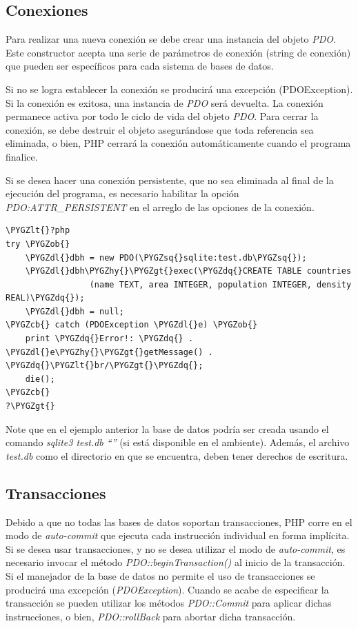 \documentclass[a5paper,10pt,spanish]{sphinxmanual}
\def\PYGZob{\char`\{}
\def\PYGZcb{\char`\}}
\def\PYGZlt{\char`\<}
\def\PYGZgt{\char`\>}
\def\PYGZdl{\char`\$}
\def\PYGZhy{\char`\-}
\def\PYGZsq{\char`\'}
\def\PYGZdq{\char`\"}
\begin{document}
\subsection{Conexiones}
\label{Tutorial5_BasesDatos.md:conexiones}
Para realizar una nueva conexión se debe crear una instancia del objeto
\emph{PDO}. Este constructor acepta una serie de parámetros de conexión
(string de conexión) que pueden ser específicos para cada sistema de
bases de datos.

Si no se logra establecer la conexión se producirá una excepción
(PDOException). Si la conexión es exitosa, una instancia de \emph{PDO} será
devuelta. La conexión permanece activa por todo le ciclo de vida del
objeto \emph{PDO}. Para cerrar la conexión, se debe destruir el objeto
asegurándose que toda referencia sea eliminada, o bien, PHP cerrará la
conexión automáticamente cuando el programa finalice.

Si se desea hacer una conexión persistente, que no sea eliminada al
final de la ejecución del programa, es necesario habilitar la opción
\emph{PDO:ATTR\_PERSISTENT} en el arreglo de las opciones de la conexión.

\begin{Verbatim}[commandchars=\\\{\}]
\PYGZlt{}?php
try \PYGZob{}
    \PYGZdl{}dbh = new PDO(\PYGZsq{}sqlite:test.db\PYGZsq{});
    \PYGZdl{}dbh\PYGZhy{}\PYGZgt{}exec(\PYGZdq{}CREATE TABLE countries
                 (name TEXT, area INTEGER, population INTEGER, density REAL)\PYGZdq{});
    \PYGZdl{}dbh = null;
\PYGZcb{} catch (PDOException \PYGZdl{}e) \PYGZob{}
    print \PYGZdq{}Error!: \PYGZdq{} . \PYGZdl{}e\PYGZhy{}\PYGZgt{}getMessage() . \PYGZdq{}\PYGZlt{}br/\PYGZgt{}\PYGZdq{};
    die();
\PYGZcb{}
?\PYGZgt{}
\end{Verbatim}

Note que en el ejemplo anterior la base de datos podría ser creada
usando el comando \emph{sqlite3 test.db ``''} (si está disponible en el
ambiente). Además, el archivo \emph{test.db} como el directorio en que se
encuentra, deben tener derechos de escritura.


\subsection{Transacciones}
\label{Tutorial5_BasesDatos.md:transacciones}
Debido a que no todas las bases de datos soportan transacciones, PHP
corre en el modo de \emph{auto-commit} que ejecuta cada instrucción
individual en forma implícita. Si se desea usar transacciones, y no se
desea utilizar el modo de \emph{auto-commit}, es necesario invocar el método
\emph{PDO::beginTransaction()} al inicio de la transacción. Si el manejador
de la base de datos no permite el uso de transacciones se producirá una
excepción (\emph{PDOException}). Cuando se acabe de especificar la
transacción se pueden utilizar los métodos \emph{PDO::Commit} para aplicar
dichas instrucciones, o bien, \emph{PDO::rollBack} para abortar dicha
transacción.
\end{document}
